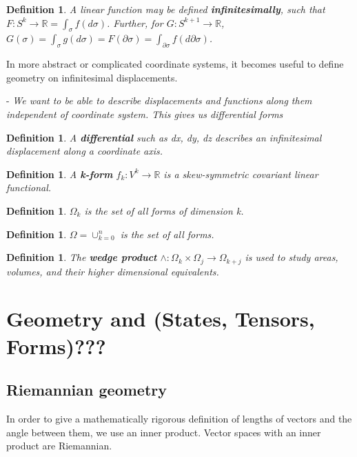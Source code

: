 \documentclass{book}
\newtheorem{defn}[equation]{Definition}
\begin{document}
\begin{defn}
	A linear function may be defined \textbf{infinitesimally}, such that $F : S^k \to \mathbb{R} = \int_{\sigma} f(d\sigma)$. Further, for $G : S^{k+1} \to \mathbb{R}$, $G(\sigma) = \int_{\sigma} g(d\sigma) = F(\partial\sigma) = \int_{\partial\sigma}f(d\partial\sigma)$. 
\end{defn}

In more abstract or complicated coordinate systems, it becomes useful to define geometry on infinitesimal displacements. 

- \emph{We want to be able to describe displacements and functions along them independent of coordinate system. This gives us differential forms}


\begin{defn}
	A \textbf{differential} such as dx, dy, dz describes an infinitesimal displacement along a coordinate axis. 
\end{defn}

\begin{defn}
	A \textbf{k-form} $f_k : V^k \to \mathbb{R}$ is a skew-symmetric covariant linear functional. 
\end{defn}

\begin{defn}
	$\Omega_k$ is the set of all forms of dimension k. 
\end{defn}

\begin{defn}
	$\Omega = \cup_{k=0}^n$ is the set of all forms. 
\end{defn}



\begin{defn}
	
	The \textbf{wedge product} $\wedge : \Omega_k \times \Omega_j \to \Omega_{k+j}$ is used to study areas, volumes, and their higher dimensional equivalents. 
\end{defn}





\chapter{Geometry and (States, Tensors, Forms)???}

\section{Riemannian geometry}
In order to give a mathematically rigorous definition of lengths of vectors and the angle between them, we use an inner product. Vector spaces with an inner product are Riemannian.
\end{document}
